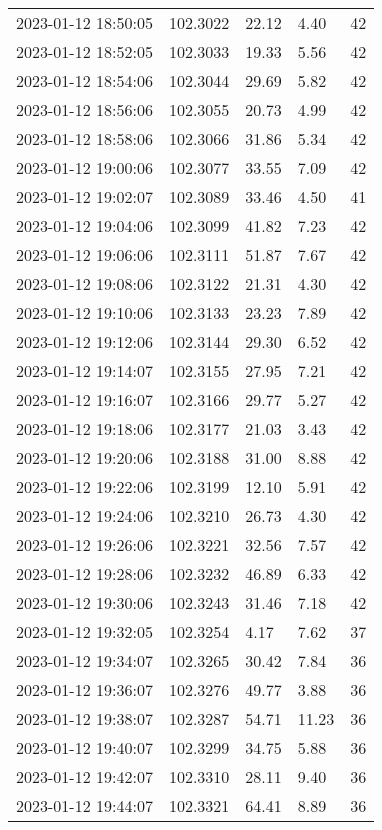 \documentclass{nature_plusfigure}
\begin{document}
\begin{supplement}
\begin{center}
\begin{longtable}{lllll}
2023-01-12 18:50:05 & 102.3022 & 22.12 & 4.40 & 42 \\ 
2023-01-12 18:52:05 & 102.3033 & 19.33 & 5.56 & 42 \\ 
2023-01-12 18:54:06 & 102.3044 & 29.69 & 5.82 & 42 \\ 
2023-01-12 18:56:06 & 102.3055 & 20.73 & 4.99 & 42 \\ 
2023-01-12 18:58:06 & 102.3066 & 31.86 & 5.34 & 42 \\ 
2023-01-12 19:00:06 & 102.3077 & 33.55 & 7.09 & 42 \\ 
2023-01-12 19:02:07 & 102.3089 & 33.46 & 4.50 & 41 \\ 
2023-01-12 19:04:06 & 102.3099 & 41.82 & 7.23 & 42 \\ 
2023-01-12 19:06:06 & 102.3111 & 51.87 & 7.67 & 42 \\ 
2023-01-12 19:08:06 & 102.3122 & 21.31 & 4.30 & 42 \\ 
2023-01-12 19:10:06 & 102.3133 & 23.23 & 7.89 & 42 \\ 
2023-01-12 19:12:06 & 102.3144 & 29.30 & 6.52 & 42 \\ 
2023-01-12 19:14:07 & 102.3155 & 27.95 & 7.21 & 42 \\ 
2023-01-12 19:16:07 & 102.3166 & 29.77 & 5.27 & 42 \\ 
2023-01-12 19:18:06 & 102.3177 & 21.03 & 3.43 & 42 \\ 
2023-01-12 19:20:06 & 102.3188 & 31.00 & 8.88 & 42 \\ 
2023-01-12 19:22:06 & 102.3199 & 12.10 & 5.91 & 42 \\ 
2023-01-12 19:24:06 & 102.3210 & 26.73 & 4.30 & 42 \\ 
2023-01-12 19:26:06 & 102.3221 & 32.56 & 7.57 & 42 \\ 
2023-01-12 19:28:06 & 102.3232 & 46.89 & 6.33 & 42 \\ 
2023-01-12 19:30:06 & 102.3243 & 31.46 & 7.18 & 42 \\ 
2023-01-12 19:32:05 & 102.3254 & 4.17 & 7.62 & 37 \\ 
2023-01-12 19:34:07 & 102.3265 & 30.42 & 7.84 & 36 \\ 
2023-01-12 19:36:07 & 102.3276 & 49.77 & 3.88 & 36 \\ 
2023-01-12 19:38:07 & 102.3287 & 54.71 & 11.23 & 36 \\ 
2023-01-12 19:40:07 & 102.3299 & 34.75 & 5.88 & 36 \\ 
2023-01-12 19:42:07 & 102.3310 & 28.11 & 9.40 & 36 \\ 
2023-01-12 19:44:07 & 102.3321 & 64.41 & 8.89 & 36 \\ 

\end{longtable}
\end{center}
\end{supplement}
\end{document}
